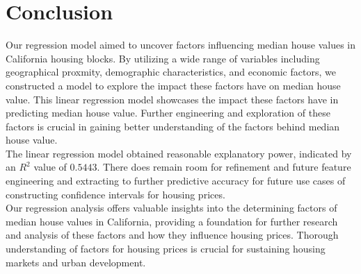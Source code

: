 \documentclass[10pt]{article}
\begin{document}
\section{Conclusion}
Our regression model aimed to uncover factors influencing median house values in California housing blocks. By utilizing a wide range of variables including
geographical proxmity, demographic characteristics, and economic factors, we constructed a model to explore the impact these factors have on 
median house value. This linear regression model showcases the impact these factors have in predicting median house value. Further engineering and
exploration of these factors is crucial in gaining better understanding of the factors behind median house value.\\
\hspace*{2em} The linear regression model obtained reasonable explanatory power, indicated by an $R^2$ value of $0.5443$. There does remain
room for refinement and future feature engineering and extracting to further predictive accuracy for future use cases of constructing confidence
intervals for housing prices.\\
\hspace*{2em} Our regression analysis offers valuable insights into the determining factors of median house values in California, providing a foundation
for further research and analysis of these factors and how they influence housing prices. Thorough understanding of factors for housing prices 
is crucial for sustaining housing markets and urban development.  
\end{document}
